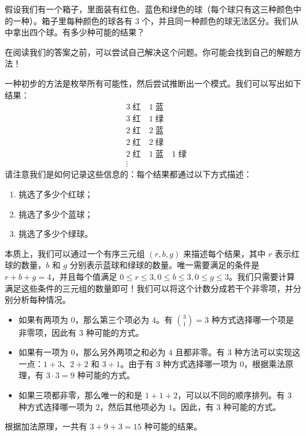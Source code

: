 \begin{example}
    假设我们有一个箱子，里面装有红色、蓝色和绿色的球（每个球只有这三种颜色中的一种）。箱子里每种颜色的球各有 $3$ 个，并且同一种颜色的球无法区分。我们从中拿出四个球。有多少种可能的结果？

    在阅读我们的答案之前，可以尝试自己解决这个问题。你可能会找到自己的解题方法！

    一种初步的方法是枚举所有可能性，然后尝试推断出一个模式。我们可以写出如下结果：
    \begin{align*}
         & 3 \;\text{红} \quad 1 \;\text{蓝}                    \\
         & 3 \;\text{红} \quad 1 \;\text{绿}                    \\
         & 2 \;\text{红} \quad 2 \;\text{蓝}                    \\
         & 2 \;\text{红} \quad 2 \;\text{绿}                    \\
         & 2 \;\text{红} \quad 1 \;\text{蓝} \quad 1 \;\text{绿} \\
         & \vdots
    \end{align*}
    请注意我们是如何记录这些信息的：每个结果都通过以下方式描述：
    \begin{enumerate}[label=(\alph*)]
        \item 挑选了多少个红球；
        \item 挑选了多少个蓝球；
        \item 挑选了多少个绿球。
    \end{enumerate}
    本质上，我们可以通过一个有序三元组 $(r, b, g)$ 来描述每个结果，其中 $r$ 表示红球的数量，$b$ 和 $g$ 分别表示蓝球和绿球的数量。唯一需要满足的条件是 $r+b+g=4$，并且每个值满足 $0 \le r \le 3, 0 \le b \le 3, 0 \le g \le 3$。我们只需要计算满足这些条件的三元组的数量即可！我们可以将这个计数分成若干个非零项，并分别分析每种情况。
    \begin{itemize}
        \item 如果有两项为 $0$，那么第三个项必为 $4$。有 ${3 \choose 1}=3$ 种方式选择哪一个项是非零项，因此有 $3$ 种可能的方式。
        \item 如果有一项为 $0$，那么另外两项之和必为 $4$ 且都非零。有 $3$ 种方法可以实现这一点：$1 + 3$、$2 + 2$ 和 $3 + 1$。由于有 $3$ 种方式选择哪一项为 $0$，根据乘法原理，有 $3 \cdot 3 = 9$ 种可能的方式。
        \item 如果三项都非零，那么唯一的和是 $1 + 1 + 2$，可以以不同的顺序排列。有 $3$ 种方式选择哪一项为 $2$，然后其他项必为 $1$。因此，有 $3$ 种可能的方式。
    \end{itemize}
    根据加法原理，一共有 $3 + 9 + 3 = 15$ 种可能的结果。
\end{example}

